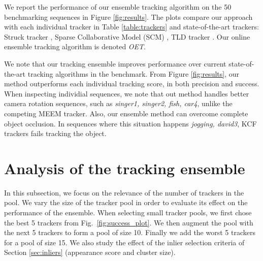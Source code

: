 We report the performance of our ensemble tracking algorithm on the 50
benchmarking sequences in
Figure \ref{fig:results}.
The plots compare our approach with each individual tracker
in Table \ref{table:trackers} and state-of-the-art trackers: Struck tracker
\cite{Hare2011}, Sparse Collaborative Model (SCM) \cite{Zhong2012}, TLD tracker
\cite{Kalal2011}. Our online ensemble tracking algorithm is denoted \textit{OET}.

We note that our tracking ensemble improves performance over current
state-of-the-art tracking algorithms in the benchmark.
From Figure \ref{fig:results}, our method outperforms each individual tracking
score, in both precision and success.
When inspecting individial sequences, we note that 
out method handles better camera
rotation sequences, such as \textit{singer1, singer2, fish, car4}, unlike
the competing
MEEM tracker. Also, our ensemble method can overcome complete object occlusion. In
sequences where this situation happens \textit{jogging, david3}, KCF trackers
fails tracking the object. 


\section{Analysis of the tracking ensemble}
In this subsection, we focus on the relevance of the number of trackers in the pool.
We vary the size of the tracker pool in order to evaluate its effect on the
performance of the ensemble.
When selecting small tracker pools, we first chose the best 5 trackers
from Fig.~\ref{fig:success_plot}. We then augment the pool with the next 5 trackers to
form a pool of size 10. Finally we add the worst 5 trackers for a pool of size 15.
We also study the effect of the inlier selection criteria of Section
\ref{sec:inliers}
(appearance score and cluster size).


